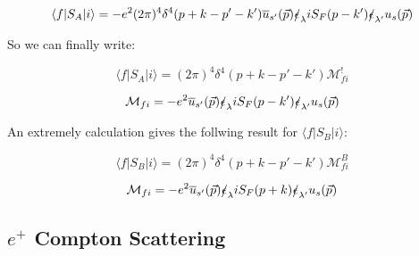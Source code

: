 \documentclass[a4]{article}
\begin{document}
\begin{framed}
            \begin{equation}
                \langle f | S_{A} | i \rangle = -e^{2} (2 \pi)^4 \delta^{4} (p + k - p' - k') \overline{u}_{s'} (\vec{p}) \slashed{\epsilon}_{\lambda} i S_{F} (p - k') \slashed{\epsilon}_{\lambda'} u_{s} (\vec{p})
            \end{equation}

            So we can finally write: 

            \begin{equation}
                \langle f | S_{A} | i \rangle = (2 \pi)^4 \delta^{4} (p + k - p' - k') \mathcal{M}_{fi}^{!}
            \end{equation}

            \begin{equation}
                \mathcal{M}_{fi} = -e^{2} \overline{u}_{s'} (\vec{p}) \slashed{\epsilon}_{\lambda} i S_{F} (p- k') \slashed{\epsilon}_{\lambda'} u_{s} (\vec{p})
            \end{equation}

            An extremely calculation gives the follwing result for $\langle f | S_{B} | i \rangle$:

            \begin{equation}
                \langle f | S_{B} | i \rangle = (2 \pi)^4 \delta^{4} (p + k - p' - k') \mathcal{M}_{fi}^{B}
            \end{equation}

            \begin{equation}
                \mathcal{M}_{fi} = -e^{2} \overline{u}_{s'} (\vec{p}) \slashed{\epsilon}_{\lambda} i S_{F} (p + k) \slashed{\epsilon}_{\lambda'} u_{s} (\vec{p})
            \end{equation}

        \end{framed}

        \subsection{$e^{+}$ Compton Scattering}
\end{document}
